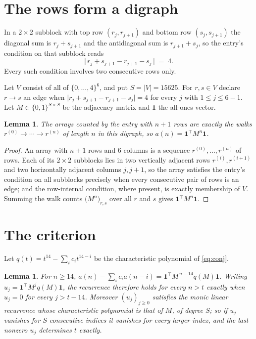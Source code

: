\documentclass[11pt,a4paper]{article}
\theoremstyle{plain}
\newtheorem{lemma}[theorem]{Lemma}
\theoremstyle{definition}
\begin{document}
\section{The rows form a digraph}

In a $2\times2$ subblock with top row $(r_j,r_{j+1})$ and bottom row $(s_j,s_{j+1})$ the
diagonal sum is $r_j+s_{j+1}$ and the antidiagonal sum is $r_{j+1}+s_j$, so the entry's
condition on that subblock reads
\[
\bigl|\,r_j+s_{j+1}-r_{j+1}-s_j\,\bigr|\;=\;4.
\]
Every such condition involves two consecutive rows only.

Let $V$ consist of all of $\{0,\dots,4\}^{6}$, and put $S=|V|=15625$. For $r,s\in V$ declare $r\to s$ an edge
when $\bigl|r_j+s_{j+1}-r_{j+1}-s_j\bigr|=4$ for every $j$ with
$1\le j\le6-1$. Let $M\in\{0,1\}^{S\times S}$ be the adjacency matrix and $\mathbf{1}$
the all-ones vector.

\begin{lemma}\label{lem:walk}
The arrays counted by the entry with $n+1$ rows are exactly the walks
$r^{(0)}\to\cdots\to r^{(n)}$ of length $n$ in this digraph, so
$a(n)=\mathbf{1}^{\!\top}M^{n}\mathbf{1}$.
\end{lemma}

\begin{proof}
An array with $n+1$ rows and $6$ columns is a sequence $r^{(0)},\dots,r^{(n)}$ of
rows. Each of its $2\times2$ subblocks lies in two vertically adjacent rows
$r^{(i)},r^{(i+1)}$ and two horizontally adjacent columns $j,j+1$, so the array satisfies
the entry's condition on all subblocks precisely when every consecutive pair of rows is an
edge; and the row-internal condition, where present, is exactly membership of $V$. Summing
the walk counts $\bigl(M^{n}\bigr)_{r,s}$ over all $r$ and $s$ gives
$\mathbf{1}^{\!\top}M^{n}\mathbf{1}$.
\end{proof}

\section{The criterion}

Let $q(t)=t^{14}-\sum_i c_i t^{14-i}$ be the characteristic polynomial of
\eqref{eq:conj}.

\begin{lemma}\label{lem:crit}
For $n\ge14$,
$a(n)-\sum_i c_i a(n-i)=\mathbf{1}^{\!\top}M^{\,n-14}q(M)\mathbf{1}$. Writing
$u_j=\mathbf{1}^{\!\top}M^{j}q(M)\mathbf{1}$, the recurrence therefore holds for every
$n>t$ exactly when $u_j=0$ for every $j>t-14$. Moreover $(u_j)_{j\ge0}$ satisfies the
monic linear recurrence whose characteristic polynomial is that of $M$, of degree $S$; so
if $u_j$ vanishes for $S$ consecutive indices it vanishes for every larger index, and the
last nonzero $u_j$ determines $t$ exactly.
\end{lemma}
\end{document}
